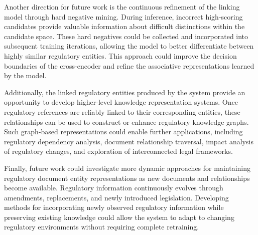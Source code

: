 Another direction for future work is the continuous refinement of the linking model through hard negative mining. During inference, incorrect high-scoring candidates provide valuable information about difficult distinctions within the candidate space. These hard negatives could be collected and incorporated into subsequent training iterations, allowing the model to better differentiate between highly similar regulatory entities. This approach could improve the decision boundaries of the cross-encoder and refine the associative representations learned by the model.

Additionally, the linked regulatory entities produced by the system provide an opportunity to develop higher-level knowledge representation systems. Once regulatory references are reliably linked to their corresponding entities, these relationships can be used to construct or enhance regulatory knowledge graphs. Such graph-based representations could enable further applications, including regulatory dependency analysis, document relationship traversal, impact analysis of regulatory changes, and exploration of interconnected legal frameworks.

Finally, future work could investigate more dynamic approaches for maintaining regulatory document entity representations as new documents and relationships become available. Regulatory information continuously evolves through amendments, replacements, and newly introduced legislation. Developing methods for incorporating newly observed regulatory information while preserving existing knowledge could allow the system to adapt to changing regulatory environments without requiring complete retraining.